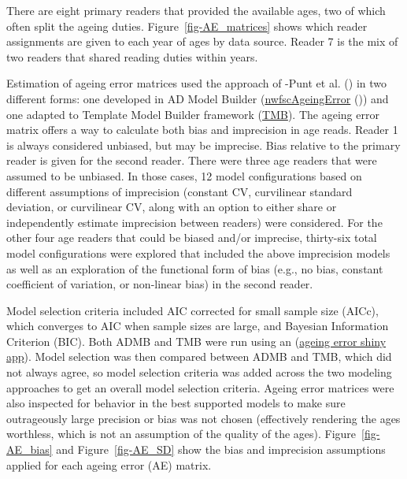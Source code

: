 \documentclass[
]{scrartcl}
\begin{document}
There are eight primary readers that provided the available ages, two of
which often split the ageing duties. Figure~\ref{fig-AE_matrices} shows
which reader assignments are given to each year of ages by data source.
Reader 7 is the mix of two readers that shared reading duties within
years.

Estimation of ageing error matrices used the approach of -Punt et al.
() in two different forms: one
developed in AD Model Builder
(\href{https://github.com/pfmc-assessments/nwfscAgeingError}{nwfscAgeingError}
()) and one adapted to Template Model Builder framework
(\href{https://pfmc-assessments.github.io/AgeingError/articles/getting_started.html}{TMB}).
The ageing error matrix offers a way to calculate both bias and
imprecision in age reads. Reader 1 is always considered unbiased, but
may be imprecise. Bias relative to the primary reader is given for the
second reader. There were three age readers that were assumed to be
unbiased. In those cases, 12 model configurations based on different
assumptions of imprecision (constant CV, curvilinear standard deviation,
or curvilinear CV, along with an option to either share or independently
estimate imprecision between readers) were considered. For the other
four age readers that could be biased and/or imprecise, thirty-six total
model configurations were explored that included the above imprecision
models as well as an exploration of the functional form of bias (e.g.,
no bias, constant coefficient of variation, or non-linear bias) in the
second reader.

Model selection criteria included AIC corrected for small sample size
(AICc), which converges to AIC when sample sizes are large, and Bayesian
Information Criterion (BIC). Both ADMB and TMB were run using an
(\href{https://github.com/shcaba/Ageing_Error_app}{ageing error shiny app}).
Model selection was then compared between ADMB and TMB, which did not
always agree, so model selection criteria was added across the two
modeling approaches to get an overall model selection criteria. Ageing
error matrices were also inspected for behavior in the best supported
models to make sure outrageously large precision or bias was not chosen
(effectively rendering the ages worthless, which is not an assumption of
the quality of the ages). Figure~\ref{fig-AE_bias} and
Figure~\ref{fig-AE_SD} show the bias and imprecision assumptions applied
for each ageing error (AE) matrix.
\end{document}
